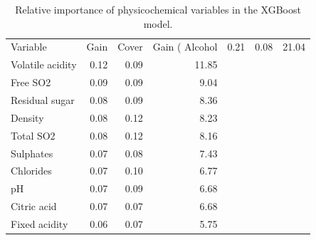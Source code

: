 \begin{table}[ht]
\centering
\begin{tabular}{lrrr}
  \toprule
Variable & Gain & Cover & Gain (%
  \midrule
Alcohol & 0.21 & 0.08 & 21.04 \\ 
  Volatile acidity & 0.12 & 0.09 & 11.85 \\ 
  Free SO2 & 0.09 & 0.09 & 9.04 \\ 
  Residual sugar & 0.08 & 0.09 & 8.36 \\ 
  Density & 0.08 & 0.12 & 8.23 \\ 
  Total SO2 & 0.08 & 0.12 & 8.16 \\ 
  Sulphates & 0.07 & 0.08 & 7.43 \\ 
  Chlorides & 0.07 & 0.10 & 6.77 \\ 
  pH & 0.07 & 0.09 & 6.68 \\ 
  Citric acid & 0.07 & 0.07 & 6.68 \\ 
  Fixed acidity & 0.06 & 0.07 & 5.75 \\ 
   \bottomrule
\end{tabular}
\caption{Relative importance of physicochemical variables in the XGBoost model.} 
\label{tab:importance}
\end{table}

